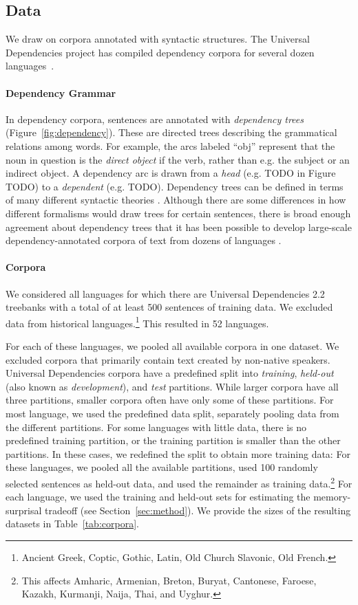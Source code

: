 \documentclass[11pt,letterpaper]{article}
\begin{document}
\subsection{Data}
We draw on corpora annotated with syntactic structures.
The Universal Dependencies project has compiled dependency corpora for several dozen languages~\citep{nivre-universal-2017}.

\paragraph{Dependency Grammar}
In dependency corpora, sentences are annotated with \emph{dependency trees} (Figure~\ref{fig:dependency}).
These are directed trees describing the grammatical relations among words. For example, the arcs labeled ``obj'' represent that the noun in question is the \emph{direct object} if the verb, rather than e.g. the subject or an indirect object.
A dependency arc is drawn from a \emph{head} (e.g. TODO in Figure TODO) to a \emph{dependent} (e.g. TODO).
Dependency trees can be defined in terms of many different syntactic theories \cite{corbett1993heads}.
Although there are some differences in how different formalisms would draw trees for certain sentences, there is broad enough agreement about dependency trees that it has been possible to develop large-scale dependency-annotated corpora of text from dozens of languages \cite{nivre2017universal}.

\paragraph{Corpora}
We considered all languages for which there are Universal Dependencies 2.2 treebanks with a total of at least 500 sentences of training data.
We excluded data from historical languages.\footnote{Ancient Greek, Coptic, Gothic, Latin, Old Church Slavonic, Old French.}
This resulted in 52 languages.

For each of these languages, we pooled all available corpora in one dataset.
We excluded corpora that primarily contain text created by non-native speakers.
Universal Dependencies corpora have a predefined split into \emph{training}, \emph{held-out} (also known as \emph{development}), and \emph{test} partitions.
While larger corpora have all three partitions, smaller corpora often have only some of these partitions.
For most language, we used the predefined data split, separately pooling data from the different partitions. %
For some languages with little data, there is no predefined training partition, or the training partition is smaller than the other partitions.
In these cases, we redefined the split to obtain more training data:
For these languages, we pooled all the available partitions, used 100 randomly selected sentences as held-out data, and used the remainder as training data.\footnote{This affects Amharic, Armenian, Breton, Buryat, Cantonese, Faroese, Kazakh, Kurmanji, Naija, Thai, and Uyghur.}
For each language, we used the training and held-out sets for estimating the memory-surprisal tradeoff (see Section~\ref{sec:method}).
We provide the sizes of the resulting datasets in Table~\ref{tab:corpora}.
\end{document}

